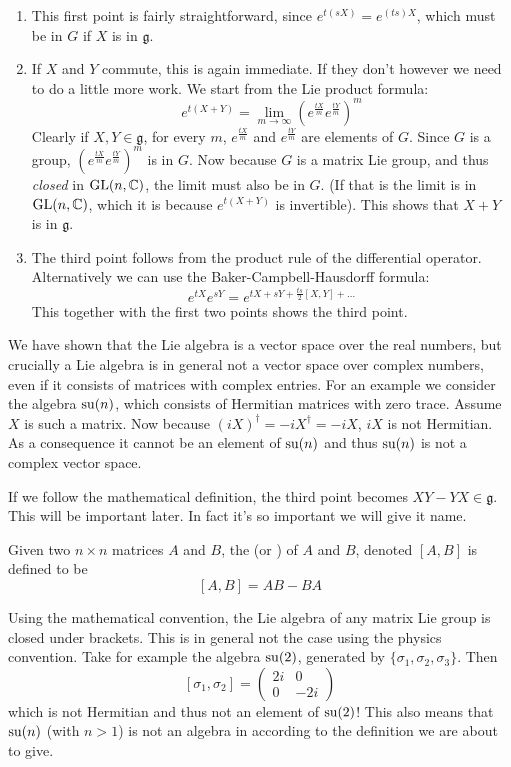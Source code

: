 \begin{enumerate}
\item This first point is fairly straightforward, since $e^{t(sX)} = e^{(ts)X}$, which must be in $G$ if $X$ is in $\mathfrak{g}$.
\item If $X$ and $Y$ commute, this is again immediate. If they don't however we need to do a little more work. We start from the Lie product formula:
\[ e^{t(X+Y)} = \lim_{m\to\infty} \left(e^{\frac{tX}{m}}e^{\frac{tY}{m}}\right)^m \]
Clearly if $X, Y \in \mathfrak{g}$,  for every $m$, $e^{\frac{tX}{m}}$ and $e^{\frac{tY}{m}}$ are elements of $G$. Since $G$ is a group, $\left(e^{\frac{tX}{m}}e^{\frac{tY}{m}}\right)^m$ is in $G$. Now because $G$ is a matrix Lie group, and thus \textit{closed} in $\operatorname{GL}(n, \mathbb{C})$, the limit must also be in $G$. (If that is the limit is in $\operatorname{GL}(n, \mathbb{C})$, which it is because $e^{t(X+Y)}$ is invertible). This shows that $X+Y$ is in $\mathfrak{g}$.
\item The third point follows from the product rule of the differential operator. Alternatively we can use the Baker-Campbell-Hausdorff formula:
\[e^{tX}e^{sY} = e^{tX+sY+ \frac{ts}{2}[X,Y] + \ldots}\]
This together with the first two points shows the third point.
\end{enumerate}

We have shown that the Lie algebra is a vector space over the real numbers, but crucially a Lie algebra is in general not a vector space over complex numbers, even if it consists of matrices with complex entries. For an example we consider the algebra $\operatorname{su}(n)$, which consists of Hermitian matrices with zero trace. Assume $X$ is such a matrix. Now because $(iX)^\dagger = -iX^\dagger = -iX$, $iX$ is not Hermitian. As a consequence it cannot be an element of $\operatorname{su}(n)$ and thus $\operatorname{su}(n)$ is not a complex vector space.

If we follow the mathematical definition, the third point becomes $XY - YX \in \mathfrak{g}$. This will be important later. In fact it's so important we will give it name.
\begin{definition}
Given two $n \times n$ matrices $A$ and $B$, the  (or ) of $A$ and $B$, denoted $[A,B]$ is defined to be
\[ [A,B] = AB - BA \]
\end{definition}

Using the mathematical convention, the Lie algebra of any matrix Lie group is closed under brackets. This is in general not the case using the physics convention. Take for example the algebra $\operatorname{su}(2)$, generated by $\{\sigma_1, \sigma_2, \sigma_3\}$. Then
\[ [\sigma_1,\sigma_2] = \begin{pmatrix}
2i & 0 \\ 0 & -2i
\end{pmatrix} \]
which is not Hermitian and thus not an element of $\operatorname{su}(2)$! This also means that $\operatorname{su}(n)$ (with $n>1$) is not an algebra in according to the definition we are about to give.

